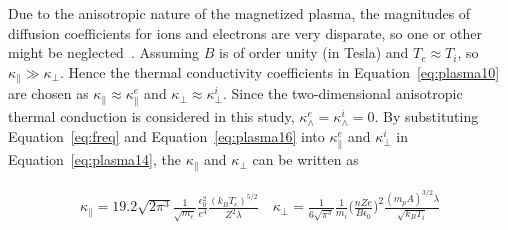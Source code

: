 \documentclass[runningheads]{llncs}
\begin{document}
Due to the anisotropic nature of the magnetized plasma, the magnitudes of diffusion coefficients for ions and electrons are very disparate, so one or other might be neglected~\cite{arter2020}. Assuming $B$ is of order unity (in Tesla) and $T_e \approx T_i$, so $\kappa_{\parallel} \gg \kappa_{\perp}$. Hence the thermal conductivity coefficients in Equation~\eqref{eq:plasma10} are chosen as $\kappa_{\parallel} \approx \kappa^e_{\parallel}$ and $\kappa_{\perp} \approx \kappa^i_{\perp}$. Since the two-dimensional anisotropic thermal conduction is considered in this study, $\kappa^e_{\wedge}=\kappa^i_{\wedge}=0$. By substituting Equation~\eqref{eq:freq} and Equation~\eqref{eq:plasma16} into $\kappa^e_{\parallel}$ and $\kappa^i_{\perp}$ in Equation~\eqref{eq:plasma14}, the $\kappa_{\parallel}$ and $\kappa_{\perp}$ can be written as

\begin{eqnarray}
\kappa_{\parallel} = 19.2 \sqrt{2\pi^3} \frac{1}{\sqrt{m_e}} \frac{\epsilon^2_0}{e^4} \frac{(k_B T_e)^{5/2}}{Z^2 \lambda} \quad \kappa_{\perp} = \frac{1}{6\sqrt{\pi^3}} \frac{1}{m_i} \Big(\frac{n Z e}{B \epsilon_0}\Big)^2 \frac{(m_p A)^{3/2}\lambda}{\sqrt{k_B T_i}}
\end{eqnarray} 
\end{document}
